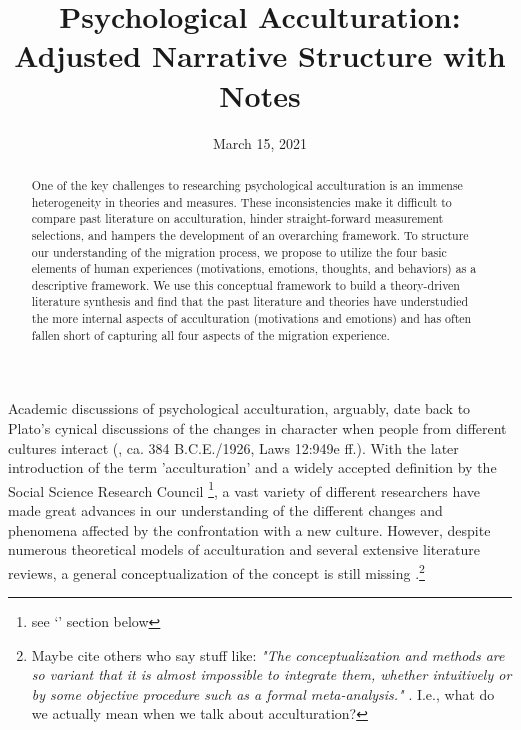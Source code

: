 \documentclass[nobib]{tufte-handout}
\title[Psychological Acculturation - Narrative]{Psychological Acculturation: \\
Adjusted Narrative Structure with Notes}
\author[Kreienkamp et al.]{}
\date{March 15, 2021}  %
\begin{document}
\maketitle %

\begin{abstract}
\noindent{}One of the key challenges to researching psychological acculturation is an immense heterogeneity in theories and measures. These inconsistencies make it difficult to compare past literature on acculturation, hinder straight-forward measurement selections, and hampers the development of an overarching framework. To structure our understanding of the migration process, we propose to utilize the four basic elements of human experiences (motivations, emotions, thoughts, and behaviors) as a descriptive framework. We use this conceptual framework to build a theory-driven literature synthesis and find that the past literature and theories have understudied the more internal aspects of acculturation (motivations and emotions) and has often fallen short of capturing all four aspects of the migration experience.
\end{abstract}


 Academic discussions of psychological acculturation, arguably, date back to Plato's cynical discussions of the changes in character when people from different cultures interact (\citeauthor{Plato1926}, ca. 384 B.C.E./1926, Laws 12:949e ff.). With the later introduction of the term 'acculturation' \citep{Powell1880} and a widely accepted definition by the Social Science Research Council \citep{Redfield1936}\footnote{see `' section below}, a vast variety of different researchers have made great advances in our understanding of the different changes and phenomena affected by the confrontation with a new culture. However, despite numerous theoretical models of acculturation and several extensive literature reviews, a general conceptualization of the concept is still missing \citep{Birman2014c}.\footnote{Maybe cite others who say stuff like: \textit{"The conceptualization and methods are so variant that it is almost impossible to integrate them, whether intuitively or by some objective procedure such as a formal meta-analysis."} \citep[p. 343]{Taft1981}. I.e., what do we actually mean when we talk about acculturation?}
\end{document}

